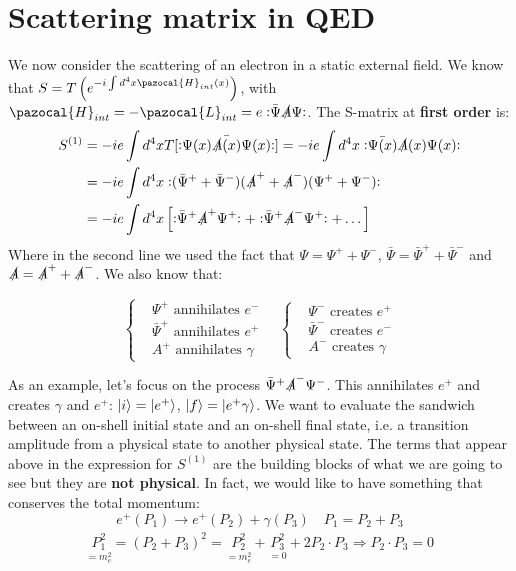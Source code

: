 \documentclass[../main.tex]{subfiles}
\begin{document}
\section{Scattering matrix in QED}
We now consider the scattering of an electron in a static external field. We know that $S=T\left(e^{-i\int d^4x\pazocal{H}_{int}(x)}\right)$, with $\pazocal{H}_{int}=-\pazocal{L}_{int}=e\norder{\bar{\Psi}\slashed{A}\Psi}$. The S-matrix at \textbf{first order} is:
\begin{align*}
S^{(1)}&=-ie\int d^4xT[\bar{\vcentcolon\mathrel{\Psi(x)\slashed{A}(x)\Psi(x)}\vcentcolon}]=-ie\int d^4x\vcentcolon\mathrel{\bar{\Psi(x)}\slashed{A}(x)\Psi(x)}\vcentcolon\\
&=-ie\int d^4x\vcentcolon\mathrel{(\bar{\Psi}^++\bar{\Psi}^-)(\slashed{A}^++\slashed{A}^-)(\Psi^++\Psi^-)}\vcentcolon\\
&=-ie\int d^4x\left[\vcentcolon\mathrel{\bar{\Psi}^+\slashed{A}^+\Psi^+}\vcentcolon+\vcentcolon\mathrel{\bar{\Psi}^+\slashed{A}^-\Psi^+}\vcentcolon+\dots\right]
\end{align*}
Where in the second line we used the fact that $\Psi=\Psi^++\Psi^-$, $\bar{\Psi}=\bar{\Psi}^++\bar{\Psi}^-$ and $\slashed{A}=\slashed{A}^++\slashed{A}^-$. We also know that:
\begin{kaobox}[frametitle=Creation and annihilation]
\[
\left\{
\begin{aligned}
&\Psi^+ \text{ annihilates } e^-\\
&\bar{\Psi}^+ \text{ annihilates } e^+\\
&A^+ \text{ annihilates } \gamma
\end{aligned}
\right.
\quad
\left\{
\begin{aligned}
&\Psi^- \text{ creates } e^+\\
&\bar{\Psi}^- \text{ creates } e^-\\
&A^- \text{ creates } \gamma
\end{aligned}
\right.
\]
\end{kaobox}
As an example, let's focus on the process $\bar{\Psi}^+\slashed{A}^-\Psi^-$. This annihilates $e^+$ and creates $\gamma$ and $e^+$: $\ket{i}=\ket{e^+}$, $\ket{f}=\ket{e^+\gamma}$. We want to evaluate the sandwich between an on-shell initial state and an on-shell final state, i.e. a transition amplitude from a physical state to another physical state. The terms that appear above in the expression for $S^{(1)}$ are the building blocks of what we are going to see but they are \textbf{not physical}. In fact, we would like to have something that conserves the total momentum:
\[
e^+(P_1)\xrightarrow[]{}e^+(P_2)+\gamma(P_3) \quad P_1=P_2+P_3
\]
\[
\underset{=m_e^2}{P_1^2}=(P_2+P_3)^2=\underset{=m_e^2}{P_2^2}+\underset{=0}{P_3^2}+2P_2\cdot P_3\Rightarrow P_2\cdot P_3=0
\]
\end{document}
